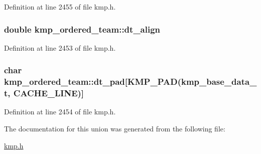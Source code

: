 Definition at line 2455 of file kmp.\-h.

\hypertarget{unionkmp__ordered__team_a5ca8af67bc2e01e55f8bbebd1bc0541a}{
\subsubsection[{dt\-\_\-align}]{\setlength{\rightskip}{0pt plus 5cm}double kmp\-\_\-ordered\-\_\-team\-::dt\-\_\-align}}\label{unionkmp__ordered__team_a5ca8af67bc2e01e55f8bbebd1bc0541a}


Definition at line 2453 of file kmp.\-h.

\hypertarget{unionkmp__ordered__team_a9c4afa12f92bb1ceab0c47e9c8193df8}{
\subsubsection[{dt\-\_\-pad}]{\setlength{\rightskip}{0pt plus 5cm}char kmp\-\_\-ordered\-\_\-team\-::dt\-\_\-pad\mbox{[}{\bf K\-M\-P\-\_\-\-P\-A\-D}({\bf kmp\-\_\-base\-\_\-data\-\_\-t}, {\bf C\-A\-C\-H\-E\-\_\-\-L\-I\-N\-E})\mbox{]}}}\label{unionkmp__ordered__team_a9c4afa12f92bb1ceab0c47e9c8193df8}


Definition at line 2454 of file kmp.\-h.



The documentation for this union was generated from the following file\-:\begin{DoxyCompactItemize}
\item 
\hyperlink{kmp_8h}{kmp.\-h}\end{DoxyCompactItemize}
